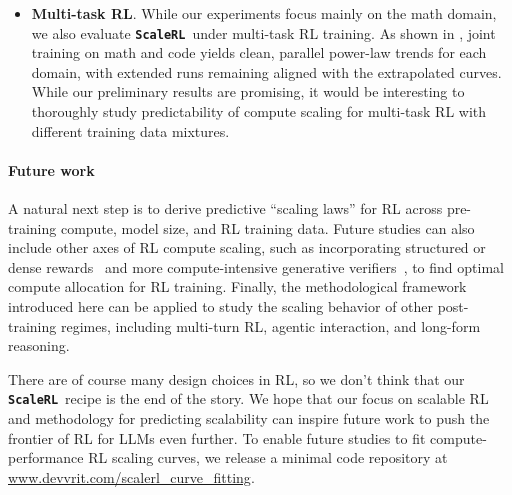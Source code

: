 \documentclass[]{fairmeta} %
\newcommand{\scalerl}{\texttt{\textbf{ScaleRL}}}
\begin{document}
\begin{itemize}
    This still leaves the question of how well the LLM would generalize from the training distribution to held out test sets. %
    While a full characterization of generalization is beyond the scope of our work, we do observe correlation between in-distribution validation and downstream generalization performance. However, there are some algorithmic choices that seem to help generalization more, that we want to note here including: larger batch size (), reducing truncations (), longer generation lengths (, ), and larger model scale (, ).

\item \textbf{Multi-task RL}. While our  experiments focus mainly on the math domain, we also evaluate \scalerl\ under multi-task RL training. As shown in , joint training on math and code yields clean, parallel power-law trends for each domain, with extended runs remaining aligned with the extrapolated curves. While our preliminary results are promising, it would be interesting to thoroughly study predictability of compute scaling for multi-task RL with different training data mixtures.
\end{itemize}



\paragraph{Future work}
A natural next step is to derive predictive ``scaling laws'' for RL across pre-training compute, model size, and RL training data.  Future studies can also include other axes of RL compute scaling, such as incorporating structured or dense rewards~\citep{rewardingprogresss} and more compute-intensive generative verifiers~\citep{zhang2025generativeverifiersrewardmodeling}, to find optimal compute allocation for RL training. Finally, the methodological framework introduced here can be applied to study the scaling behavior of other post-training regimes, including multi-turn RL, agentic interaction, and long-form reasoning.

There are of course many design choices in RL, so we don't think that our \scalerl\ recipe is the end of the story. We hope that our focus on scalable RL and methodology for predicting scalability can inspire future work to push the frontier of RL for LLMs even further.  To enable future studies to fit compute-performance RL scaling curves, we release a minimal code repository at \href{https://www.devvrit.com/scalerl_curve_fitting}{www.devvrit.com/scalerl\_curve\_fitting}.
\end{document}
